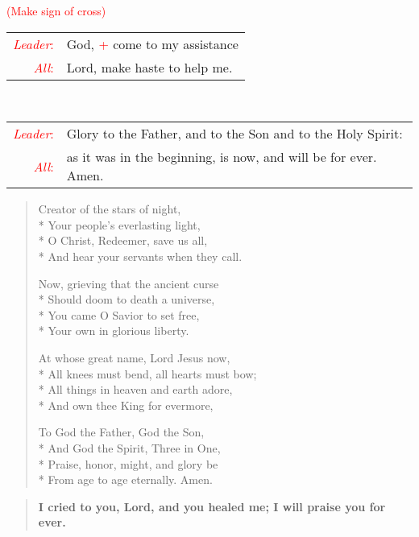 \documentclass[letterpaper,14pt]{extarticle}
\newcommand{\side}[1]{\flagverse{\textcolor{red}{\textit{#1}}:}}
\newcommand{\sidestar}[1]{\textcolor{red}{\textit{#1}:}}
\newcommand{\rednote}[1]{\textcolor{red}{#1}}
\newlength{\oldindent}
\newcommand{\antiphon}[2]{
	\setlength{\oldindent}{\vindent}
	\setlength{\vindent}{0em}
	\begin{verse}
	\side{#1} \textbf{#2}
	\end{verse}
	\setlength{\vindent}{\oldindent}
}
\newcommand{\intercession}[2]{
	\begin{tabular}[h]{r p{4.25in}}
		\sidestar{Leader} & #1 \\
		\sidestar{All} & #2
	\end{tabular}}
\begin{document}
\hspace{\leftmargini}\rednote{(Make sign of cross)}\\
\intercession{God, \rednote{+} come to my assistance}
{Lord, make haste to help me.}\\
\intercession{Glory to the Father, and to the Son and to the Holy Spirit:}
{as it was in the beginning, is now, and will be for ever. Amen.}

\begin{verse}

	Creator of the stars of night, \\*
	Your people’s everlasting light, \\*
	O Christ, Redeemer, save us all, \\*
	And hear your servants when they call.
	
	Now, grieving that the ancient curse \\*
	Should doom to death a universe, \\*
	You came O Savior to set free, \\*
	Your own in glorious liberty.
	
	At whose great name, Lord Jesus now, \\*
	All knees must bend, all hearts must bow; \\*
	All things in heaven and earth adore, \\*
	And own thee King for evermore,
	
	To God the Father, God the Son, \\*
	And God the Spirit, Three in One, \\*
	Praise, honor, might, and glory be \\*
	From age to age eternally. Amen.
	
\end{verse}
\newpage
{}
\antiphon{Leader 1}{I cried to you, Lord, and you healed me; I will praise you for ever.}
\end{document}
